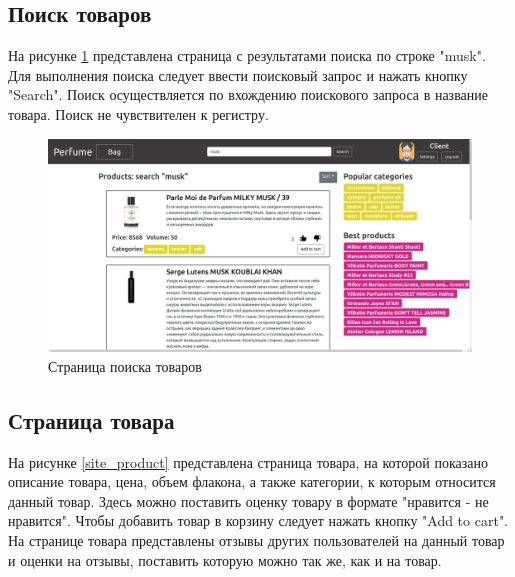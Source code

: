 \subsection{Поиск товаров}

На рисунке \ref{site_search} представлена страница с результатами поиска по строке "musk". Для выполнения поиска следует ввести поисковый запрос и нажать кнопку "Search". Поиск осуществляется по вхождению поискового запроса в название товара. Поиск не чувствителен к регистру.

\captionsetup{singlelinecheck = false, justification=centering}
\begin{figure}[h!]
	\begin{center}
		\includegraphics[scale=0.45]{assets/site_search.jpg}
	\end{center}
	\caption{Страница поиска товаров}
	\label{site_search}
\end{figure}

\subsection{Страница товара}

На рисунке \ref{site_product} представлена страница товара, на которой показано описание товара, цена, объем флакона, а также категории, к которым относится данный товар. Здесь можно поставить оценку товару в формате "нравится - не нравится". Чтобы добавить товар в корзину следует нажать кнопку "Add to cart". На странице товара представлены отзывы других пользователей на данный товар и оценки на отзывы, поставить которую можно так же, как и на товар. 

